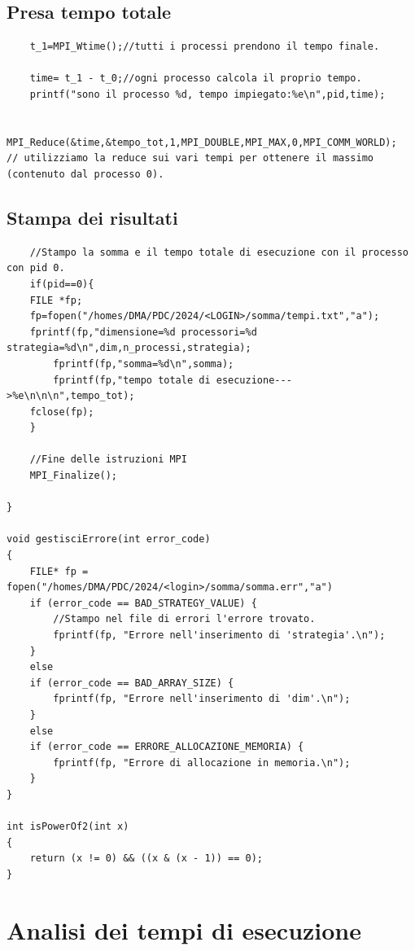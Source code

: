 \documentclass{article}
\begin{document}
\subsection{Presa tempo totale}

\begin{lstlisting}
    t_1=MPI_Wtime();//tutti i processi prendono il tempo finale.

    time= t_1 - t_0;//ogni processo calcola il proprio tempo.
    printf("sono il processo %d, tempo impiegato:%e\n",pid,time);
    
    MPI_Reduce(&time,&tempo_tot,1,MPI_DOUBLE,MPI_MAX,0,MPI_COMM_WORLD);  // utilizziamo la reduce sui vari tempi per ottenere il massimo (contenuto dal processo 0).
\end{lstlisting}

\subsection{Stampa dei risultati}

\begin{lstlisting}
    //Stampo la somma e il tempo totale di esecuzione con il processo con pid 0.
    if(pid==0){
	FILE *fp;
	fp=fopen("/homes/DMA/PDC/2024/<LOGIN>/somma/tempi.txt","a");
	fprintf(fp,"dimensione=%d processori=%d strategia=%d\n",dim,n_processi,strategia);
        fprintf(fp,"somma=%d\n",somma);
        fprintf(fp,"tempo totale di esecuzione--->%e\n\n\n",tempo_tot);
	fclose(fp);
    }

    //Fine delle istruzioni MPI
    MPI_Finalize();

}

void gestisciErrore(int error_code)
{   
    FILE* fp = fopen("/homes/DMA/PDC/2024/<login>/somma/somma.err","a")
    if (error_code == BAD_STRATEGY_VALUE) {
        //Stampo nel file di errori l'errore trovato.
        fprintf(fp, "Errore nell'inserimento di 'strategia'.\n");
    }
    else
    if (error_code == BAD_ARRAY_SIZE) {
        fprintf(fp, "Errore nell'inserimento di 'dim'.\n");
    }
    else
    if (error_code == ERRORE_ALLOCAZIONE_MEMORIA) {
        fprintf(fp, "Errore di allocazione in memoria.\n");
    }
}

int isPowerOf2(int x)
{
    return (x != 0) && ((x & (x - 1)) == 0);
}
\end{lstlisting}


\section{Analisi dei tempi di esecuzione}
\end{document}
